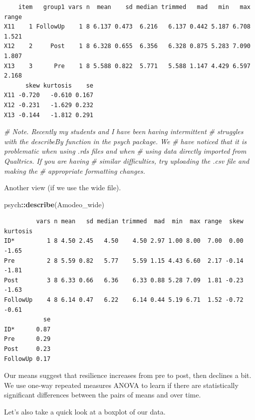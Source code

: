 \documentclass[
  11pt,
]{book}
\newenvironment{Shaded}{\begin{snugshade}}{\end{snugshade}}
\newcommand{\CommentTok}[1]{\textcolor[rgb]{0.37,0.37,0.37}{\textit{#1}}}
\newcommand{\FunctionTok}[1]{\textcolor[rgb]{0.27,0.27,0.27}{\textbf{#1}}}
\newcommand{\NormalTok}[1]{#1}
\newcommand{\SpecialCharTok}[1]{\textcolor[rgb]{0.43,0.43,0.43}{\textbf{#1}}}
\begin{document}
\begin{verbatim}
    item   group1 vars n  mean    sd median trimmed   mad   min   max range
X11    1 FollowUp    1 8 6.137 0.473  6.216   6.137 0.442 5.187 6.708 1.521
X12    2     Post    1 8 6.328 0.655  6.356   6.328 0.875 5.283 7.090 1.807
X13    3      Pre    1 8 5.588 0.822  5.771   5.588 1.147 4.429 6.597 2.168
      skew kurtosis    se
X11 -0.720   -0.610 0.167
X12 -0.231   -1.629 0.232
X13 -0.144   -1.812 0.291
\end{verbatim}

\begin{Shaded}
\begin{Highlighting}[]
\CommentTok{\# Note. Recently my students and I have been having intermittent}
\CommentTok{\# struggles with the describeBy function in the psych package. We}
\CommentTok{\# have noticed that it is problematic when using .rds files and when}
\CommentTok{\# using data directly imported from Qualtrics. If you are having}
\CommentTok{\# similar difficulties, try uploading the .csv file and making the}
\CommentTok{\# appropriate formatting changes.}
\end{Highlighting}
\end{Shaded}

Another view (if we use the wide file).

\begin{Shaded}
\begin{Highlighting}[]
\NormalTok{psych}\SpecialCharTok{::}\FunctionTok{describe}\NormalTok{(Amodeo\_wide)}
\end{Highlighting}
\end{Shaded}

\begin{verbatim}
         vars n mean   sd median trimmed  mad  min  max range  skew kurtosis
ID*         1 8 4.50 2.45   4.50    4.50 2.97 1.00 8.00  7.00  0.00    -1.65
Pre         2 8 5.59 0.82   5.77    5.59 1.15 4.43 6.60  2.17 -0.14    -1.81
Post        3 8 6.33 0.66   6.36    6.33 0.88 5.28 7.09  1.81 -0.23    -1.63
FollowUp    4 8 6.14 0.47   6.22    6.14 0.44 5.19 6.71  1.52 -0.72    -0.61
           se
ID*      0.87
Pre      0.29
Post     0.23
FollowUp 0.17
\end{verbatim}

Our means suggest that resilience increases from pre to post, then declines a bit. We use one-way repeated measures ANOVA to learn if there are statistically significant differences between the pairs of means and over time.

Let's also take a quick look at a boxplot of our data.
\end{document}
